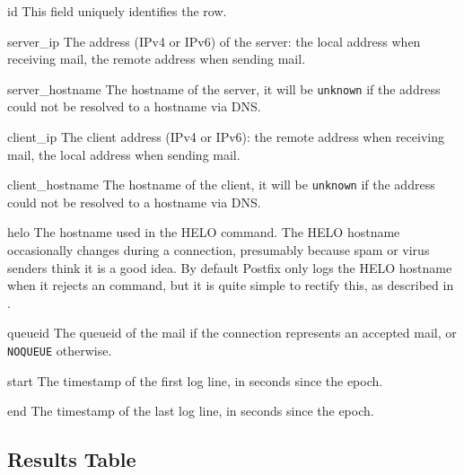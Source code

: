 \begin{boldeqlist}

    \item [id] This field uniquely identifies the row.

    \item [server\_ip] The  address (IPv4 or IPv6) of the
        server: the local address when receiving mail, the remote address
        when sending mail.

    \item [server\_hostname] The hostname of the server, it will be
        \texttt{unknown} if the  address could not be resolved
        to a hostname via DNS\@.

    \item [client\_ip] The client  address (IPv4 or IPv6): the
        remote address when receiving mail, the local address when sending
        mail.

    \item [client\_hostname] The hostname of the client, it will be
        \texttt{unknown} if the  address could not be resolved
        to a hostname via DNS\@.

    \item [helo] The hostname used in the HELO command.  The HELO hostname
        occasionally changes during a connection, presumably because spam
        or virus senders think it is a good idea.  By default Postfix only
        logs the HELO hostname when it rejects an  command,
        but it is quite simple to rectify this, as described in
        .

    \item [queueid] The queueid of the mail if the connection represents an
        accepted mail, or \texttt{NOQUEUE} otherwise.

    \item [start] The timestamp of the first log line, in seconds since the
        epoch.

    \item [end] The timestamp of the last log line, in seconds since the
        epoch.

\end{boldeqlist}

\subsection{Results Table}

